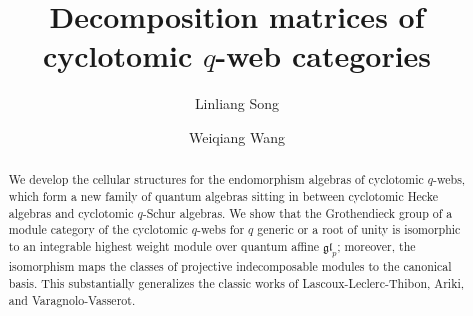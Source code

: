 \documentclass[11pt,letterpaper]{amsart}
\numberwithin{equation}{section}
\theoremstyle{remark}
\begin{document}
\setlength{\baselineskip}{17pt}
\title{Decomposition matrices of cyclotomic $q$-web categories}

\author{Linliang Song}
\address{School of Mathematical Science, Tongji University, Shanghai, 200092, China} 

\author{Weiqiang Wang}
 \address{Department of Mathematics, University of Virginia, Charlottesville, VA 22904, USA} 




\begin{abstract}
We develop the cellular structures for the endomorphism algebras of cyclotomic $q$-webs, which form a new family of quantum algebras sitting in between cyclotomic Hecke algebras and cyclotomic $q$-Schur algebras. We show that the Grothendieck group of a module category of the cyclotomic $q$-webs for $q$ generic or a root of unity is isomorphic to an integrable highest weight module over quantum affine  $\mathfrak{gl}_p$; moreover, the isomorphism maps the classes of projective indecomposable modules to the canonical basis. This substantially generalizes the classic works of Lascoux-Leclerc-Thibon, Ariki, and Varagnolo-Vasserot.
\end{abstract}

\maketitle


%
\setcounter{tocdepth}{1}
\tableofcontents
    


%

%

%

%

%

%





\end{document}
